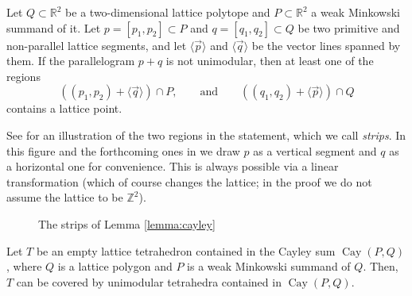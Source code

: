 \documentclass[12pt]{article}
\newcommand{\Z}{ \ensuremath{\mathbb{Z}}}
\newcommand{\R}{ \ensuremath{\mathbb{R}}}
\newcommand{\cayley}{\operatorname{Cay}}
\newcommand{\vecline}[1]{\langle \vec #1 \rangle}
\begin{document}
\begin{lemma}
\label{lemma:cayley}
Let $Q\subset \R^2$ be a two-dimensional lattice polytope and $P\subset \R^2$ a weak Minkowski summand of it. 
Let $p=[p_1,p_2] \subset P$ and $q=[q_1,q_2]\subset Q$ be two primitive and non-parallel lattice segments, and let $\vecline p$ and $ \vecline q$ be the vector lines spanned by them.  If the parallelogram $p + q$ is not unimodular, then at least one of the regions
\[
((p_1, p_2) + \vecline q ) \cap P, 
\qquad \text{and} \qquad
((q_1, q_2) + \vecline p ) \cap Q
\]
contains a lattice point. 
\end{lemma}

See  for an illustration of the two regions in the statement, which we call \emph{strips}. In this figure and the forthcoming ones in  
we draw $p$ as a vertical segment and $q$ as a horizontal one for convenience. This is always possible via a linear transformation (which of course changes the lattice; in the proof we do not assume the lattice to be $\Z^2$). 


\begin{figure}[htb]
\scalebox{.75}{}
\caption{The strips  of Lemma \ref{lemma:cayley}}
\label{fig:strips}
\end{figure}

\begin{corollary}
\label{coro:covercayley}
Let $T$ be an empty lattice tetrahedron contained in the Cayley sum $\cayley(P,Q)$, where $Q$ is a lattice polygon and $P$ is a weak Minkowski summand of $Q$. Then, $T$ can be covered by unimodular tetrahedra contained in $\cayley(P,Q)$.
\end{corollary}
\end{document}
